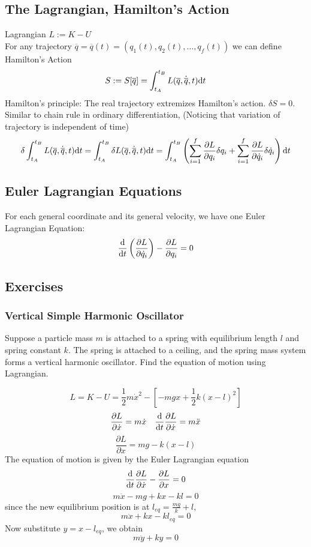 \documentclass[a4paper,12pt,titlepage]{article}
\begin{document}
\subsection{The Lagrangian, Hamilton's Action}
Lagrangian $L:=K-U$\\
For any trajectory $\overline{q}=\overline{q}(t)=(q_1(t),q_2(t),\dots,q_f(t))$ we can define Hamilton's Action
\[S:=S[\overline{q}]=\int_{t_{A}}^{t_{B}}L(\overline{q},\dot{\overline{q}},t)\mathrm{d} t\]
Hamilton's principle: The real trajectory extremizes Hamilton's action. $\delta S=0$. Similar to chain rule in ordinary differentiation, (Noticing that variation of trajectory is independent of time)
\[\delta\int_{t_A}^{t_B}L(\overline{q},\dot{\overline{q}},t)\mathrm{d} t=\int_{t_A}^{t_B}\delta L(\overline{q},\dot{\overline{q}},t)\mathrm{d} t=\int_{t_A}^{t_B}\left(\sum_{i=1}^{f}\frac{\partial L}{\partial q_i}\delta q_i+\sum_{i=1}^{f}\frac{\partial L}{\partial \dot q_i}\delta \dot q_i\right)\mathrm{d} t\]
\subsection{Euler Lagrangian Equations}
For each general coordinate and its general velocity, we have one Euler Lagrangian Equation:
\[\frac{\mathrm{d}}{\mathrm{d} t}\left(\frac{\partial L}{\partial\dot q_i}\right)-\frac{\partial L}{\partial q_i}=0\]
\subsection{Exercises}
\subsubsection{Vertical Simple Harmonic Oscillator}
Suppose a particle mass $m$ is attached to a spring with equilibrium length $l$ and spring constant $k$. The spring is attached to a ceiling, and the spring mass system forms a vertical harmonic oscillator. Find the equation of motion using Lagrangian.

\[L=K-U=\frac{1}{2}m\dot x^2-[-mgx+\frac{1}{2}k(x-l)^2]\]
\[\frac{\partial L}{\partial\dot x}=m\dot x\quad\frac{\mathrm{d}}{\mathrm{d} t}\frac{\partial L}{\partial\dot x}=m\ddot x\]
\[\frac{\partial L}{\partial x}=mg-k(x-l)\]
The equation of motion is given by the Euler Lagrangian equation
\[\frac{\mathrm{d} }{\mathrm{d} t}\frac{\partial L}{\partial \dot x}-\frac{\partial L}{\partial x}=0\]
\[m\ddot x-mg+kx-kl=0\]
since the new equilibrium position is at $l_{eq}=\frac{mg}{k}+l$,
\[m\ddot x+kx-kl_{eq}=0\]
Now substitute $y=x-l_{eq}$, we obtain
\[m\ddot y+ky=0\]
\end{document}
